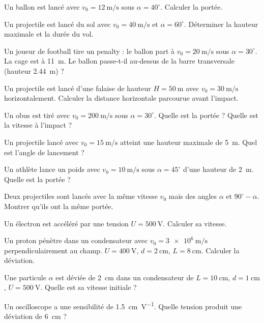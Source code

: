 \exo{} Un ballon est lancé avec $v_0=\SI{12}{\metre\per\second}$ sous $\alpha=40^\circ$. Calculer la portée.

\exo{} Un projectile est lancé du sol avec $v_0=\SI{40}{\metre\per\second}$ et $\alpha=60^\circ$. Déterminer la hauteur maximale et la durée du vol.

\exo{} Un joueur de football tire un penalty : le ballon part à $v_0=\SI{20}{\metre\per\second}$ sous $\alpha=30^\circ$. La cage est à \SI{11}{\metre}. Le ballon passe-t-il au-dessus de la barre transversale (hauteur \SI{2.44}{\metre}) ?

\exo{} Un projectile est lancé d’une falaise de hauteur $H=\SI{50}{\metre}$ avec $v_0=\SI{30}{\metre\per\second}$ horizontalement. Calculer la distance horizontale parcourue avant l’impact.

\exo{} Un obus est tiré avec $v_0=\SI{200}{\metre\per\second}$ sous $\alpha=30^\circ$. Quelle est la portée ? Quelle est la vitesse à l’impact ?

\exo{} Un projectile lancé avec $v_0=\SI{15}{\metre\per\second}$ atteint une hauteur maximale de \SI{5}{\metre}. Quel est l’angle de lancement ?

\exo{} Un athlète lance un poids avec $v_0=\SI{10}{\metre\per\second}$ sous $\alpha=45^\circ$ d’une hauteur de \SI{2}{\metre}. Quelle est la portée ?

\exo{} Deux projectiles sont lancés avec la même vitesse $v_0$ mais des angles $\alpha$ et $90^\circ-\alpha$. Montrer qu’ils ont la même portée.


\exo{} Un électron est accéléré par une tension $U=\SI{500}{\volt}$. Calculer sa vitesse.

\exo{} Un proton pénètre dans un condensateur avec $v_0=\SI{3e6}{\metre\per\second}$ perpendiculairement au champ. $U=\SI{400}{\volt}$, $d=\SI{2}{\centi\metre}$, $L=\SI{8}{\centi\metre}$. Calculer la déviation.

\exo{} Une particule $\alpha$ est déviée de \SI{2}{\centi\metre} dans un condensateur de $L=\SI{10}{\centi\metre}$, $d=\SI{1}{\centi\metre}$, $U=\SI{500}{\volt}$. Quelle est sa vitesse initiale ?

\exo{} Un oscilloscope a une sensibilité de \SI{1.5}{\centi\metre\per\volt}. Quelle tension produit une déviation de \SI{6}{\centi\metre} ?

